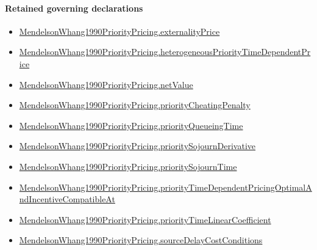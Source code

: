 \documentclass[10pt]{article}
\begin{document}
\paragraph{Retained governing declarations}
\begin{itemize}\raggedright
\item \hyperlink{governing-declaration-806f5a55d6021334}{Mendelson\allowbreak{}Whang1990\allowbreak{}Priority\allowbreak{}Pricing.\allowbreak{}externality\allowbreak{}Price}
\item \hyperlink{paper-prerequisite-d3f248a0395e1c76}{Mendelson\allowbreak{}Whang1990\allowbreak{}Priority\allowbreak{}Pricing.\allowbreak{}heterogeneous\allowbreak{}Priority\allowbreak{}Time\allowbreak{}Dependent\allowbreak{}Price}
\item \hyperlink{paper-prerequisite-7dbaca4145f3a4a5}{Mendelson\allowbreak{}Whang1990\allowbreak{}Priority\allowbreak{}Pricing.\allowbreak{}net\allowbreak{}Value}
\item \hyperlink{paper-prerequisite-54c5682d350b5d3d}{Mendelson\allowbreak{}Whang1990\allowbreak{}Priority\allowbreak{}Pricing.\allowbreak{}priority\allowbreak{}Cheating\allowbreak{}Penalty}
\item \hyperlink{paper-prerequisite-49957d909aa24bc5}{Mendelson\allowbreak{}Whang1990\allowbreak{}Priority\allowbreak{}Pricing.\allowbreak{}priority\allowbreak{}Queueing\allowbreak{}Time}
\item \hyperlink{governing-declaration-41afc2346e61f660}{Mendelson\allowbreak{}Whang1990\allowbreak{}Priority\allowbreak{}Pricing.\allowbreak{}priority\allowbreak{}Sojourn\allowbreak{}Derivative}
\item \hyperlink{governing-declaration-703b87082556903f}{Mendelson\allowbreak{}Whang1990\allowbreak{}Priority\allowbreak{}Pricing.\allowbreak{}priority\allowbreak{}Sojourn\allowbreak{}Time}
\item \hyperlink{paper-prerequisite-3ae6b5293fffafb7}{Mendelson\allowbreak{}Whang1990\allowbreak{}Priority\allowbreak{}Pricing.\allowbreak{}priority\allowbreak{}Time\allowbreak{}Dependent\allowbreak{}Pricing\allowbreak{}Optimal\allowbreak{}And\allowbreak{}Incentive\allowbreak{}Compatible\allowbreak{}At}
\item \hyperlink{paper-prerequisite-ae05cc1b41c33470}{Mendelson\allowbreak{}Whang1990\allowbreak{}Priority\allowbreak{}Pricing.\allowbreak{}priority\allowbreak{}Time\allowbreak{}Linear\allowbreak{}Coefficient}
\item \hyperlink{paper-prerequisite-33c9dc55ddc7d5b6}{Mendelson\allowbreak{}Whang1990\allowbreak{}Priority\allowbreak{}Pricing.\allowbreak{}source\allowbreak{}Delay\allowbreak{}Cost\allowbreak{}Conditions}

\end{itemize}
\end{document}
